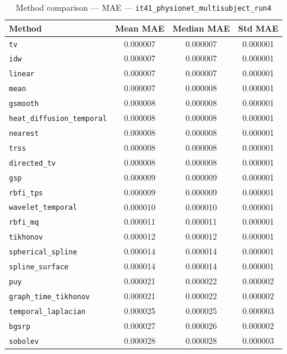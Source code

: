 \begin{table}[ht]
\centering
\caption{Method comparison — MAE — \texttt{it41_physionet_multisubject_run4}}
\label{tab:mae_it41_physionet_multisubject_run4}
\begin{tabular}{lccc}
\hline
Method & Mean MAE & Median MAE & Std MAE \\
\hline
\texttt{tv} & 0.000007 & 0.000007 & 0.000001 \\
\texttt{idw} & 0.000007 & 0.000007 & 0.000001 \\
\texttt{linear} & 0.000007 & 0.000007 & 0.000001 \\
\texttt{mean} & 0.000007 & 0.000008 & 0.000001 \\
\texttt{gsmooth} & 0.000008 & 0.000008 & 0.000001 \\
\texttt{heat_diffusion_temporal} & 0.000008 & 0.000008 & 0.000001 \\
\texttt{nearest} & 0.000008 & 0.000008 & 0.000001 \\
\texttt{trss} & 0.000008 & 0.000008 & 0.000001 \\
\texttt{directed_tv} & 0.000008 & 0.000008 & 0.000001 \\
\texttt{gsp} & 0.000009 & 0.000009 & 0.000001 \\
\texttt{rbfi_tps} & 0.000009 & 0.000009 & 0.000001 \\
\texttt{wavelet_temporal} & 0.000010 & 0.000010 & 0.000001 \\
\texttt{rbfi_mq} & 0.000011 & 0.000011 & 0.000001 \\
\texttt{tikhonov} & 0.000012 & 0.000012 & 0.000001 \\
\texttt{spherical_spline} & 0.000014 & 0.000014 & 0.000001 \\
\texttt{spline_surface} & 0.000014 & 0.000014 & 0.000001 \\
\texttt{puy} & 0.000021 & 0.000022 & 0.000002 \\
\texttt{graph_time_tikhonov} & 0.000021 & 0.000022 & 0.000002 \\
\texttt{temporal_laplacian} & 0.000025 & 0.000025 & 0.000003 \\
\texttt{bgsrp} & 0.000027 & 0.000026 & 0.000002 \\
\texttt{sobolev} & 0.000028 & 0.000028 & 0.000003 \\
\hline
\end{tabular}
\end{table}
